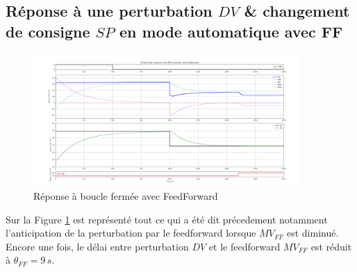 \subsection{Réponse à une perturbation \texorpdfstring{$DV$}{DV} \& changement de consigne \texorpdfstring{$SP$}{SP} en mode automatique avec FF}
\begin{figure}[H]
    \centering
    \includegraphics[width=0.9\textwidth]{../Plots/Simulation_scenario_7.png}
    \caption{Réponse à boucle fermée avec FeedForward}
    \label{fig:Simulation_CLP_FF}
\end{figure}
Sur la Figure \ref{fig:Simulation_CLP_FF} est représenté tout ce qui a été dit précedement notamment l'anticipation de la perturbation par le feedforward lorsque $MV_{FF}$ est diminué.
Encore une fois, le délai entre perturbation $DV$ et le feedforward $MV_{FF}$ est réduit à $\theta_{FF} = 9\,s$.


